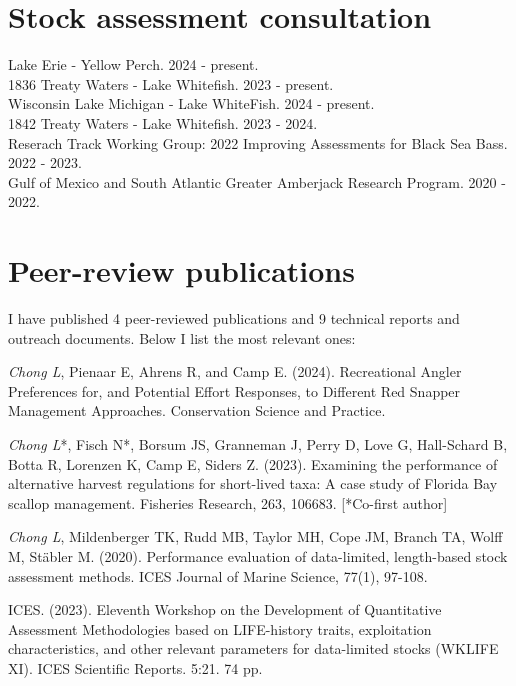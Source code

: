 \documentclass[
  11pt,
]
{article}
\begin{document}
\section{Stock assessment
consultation}\label{stock-assessment-consultation}

Lake Erie - Yellow Perch. \hfill 2024 - present.\\
1836 Treaty Waters - Lake Whitefish. \hfill 2023 - present.\\
Wisconsin Lake Michigan - Lake WhiteFish. \hfill 2024 - present.\\
1842 Treaty Waters - Lake Whitefish. \hfill 2023 - 2024.\\
Reserach Track Working Group: 2022 Improving Assessments for Black Sea
Bass. \hfill 2022 - 2023.\\
Gulf of Mexico and South Atlantic Greater Amberjack Research Program.
\hfill 2020 - 2022.

\section{Peer-review publications}\label{peer-review-publications}

I have published 4 peer-reviewed publications and 9 technical reports
and outreach documents. Below I list the most relevant ones:

\emph{Chong L}, Pienaar E, Ahrens R, and Camp E. (2024). Recreational
Angler Preferences for, and Potential Effort Responses, to Different Red
Snapper Management Approaches. Conservation Science and Practice.

\emph{Chong L}*, Fisch N*, Borsum JS, Granneman J, Perry D, Love G,
Hall-Schard B, Botta R, Lorenzen K, Camp E, Siders Z. (2023). Examining
the performance of alternative harvest regulations for short-lived taxa:
A case study of Florida Bay scallop management. Fisheries Research, 263,
106683. {[}*Co-first author{]}

\emph{Chong L}, Mildenberger TK, Rudd MB, Taylor MH, Cope JM, Branch TA,
Wolff M, Stäbler M. (2020). Performance evaluation of data-limited,
length-based stock assessment methods. ICES Journal of Marine Science,
77(1), 97-108.

ICES. (2023). Eleventh Workshop on the Development of Quantitative
Assessment Methodologies based on LIFE-history traits, exploitation
characteristics, and other relevant parameters for data-limited stocks
(WKLIFE XI). ICES Scientific Reports. 5:21. 74 pp.
\end{document}
